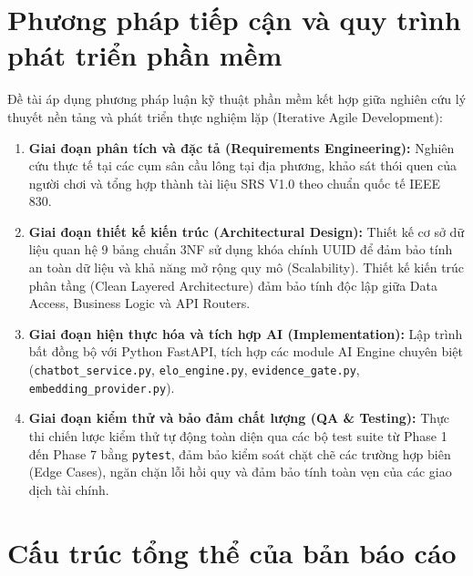 \section{Phương pháp tiếp cận và quy trình phát triển phần mềm}
\label{sec:phuongphap}

Đề tài áp dụng phương pháp luận kỹ thuật phần mềm kết hợp giữa nghiên cứu lý thuyết nền tảng và phát triển thực nghiệm lặp (Iterative Agile Development):
\begin{enumerate}[label=\alph*)]
    \item \textbf{Giai đoạn phân tích và đặc tả (Requirements Engineering):} Nghiên cứu thực tế tại các cụm sân cầu lông tại địa phương, khảo sát thói quen của người chơi và tổng hợp thành tài liệu SRS V1.0 theo chuẩn quốc tế IEEE 830.
    \item \textbf{Giai đoạn thiết kế kiến trúc (Architectural Design):} Thiết kế cơ sở dữ liệu quan hệ 9 bảng chuẩn 3NF sử dụng khóa chính UUID để đảm bảo tính an toàn dữ liệu và khả năng mở rộng quy mô (Scalability). Thiết kế kiến trúc phân tầng (Clean Layered Architecture) đảm bảo tính độc lập giữa Data Access, Business Logic và API Routers.
    \item \textbf{Giai đoạn hiện thực hóa và tích hợp AI (Implementation):} Lập trình bất đồng bộ với Python FastAPI, tích hợp các module AI Engine chuyên biệt (\texttt{chatbot\_service.py}, \texttt{elo\_engine.py}, \texttt{evidence\_gate.py}, \texttt{embedding\_provider.py}).
    \item \textbf{Giai đoạn kiểm thử và bảo đảm chất lượng (QA \& Testing):} Thực thi chiến lược kiểm thử tự động toàn diện qua các bộ test suite từ Phase 1 đến Phase 7 bằng \texttt{pytest}, đảm bảo kiểm soát chặt chẽ các trường hợp biên (Edge Cases), ngăn chặn lỗi hồi quy và đảm bảo tính toàn vẹn của các giao dịch tài chính.
\end{enumerate}

\section{Cấu trúc tổng thể của bản báo cáo}
\label{sec:cautruc}

